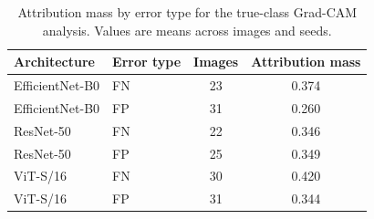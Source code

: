 \begin{table}[h]
\centering
\small
\caption{Attribution mass by error type for the true-class Grad-CAM analysis. Values are means across images and seeds.}
\label{tab:suppxai}
\begin{tabular}{llcc}
\toprule
Architecture & Error type & Images & Attribution mass \\
\midrule
EfficientNet-B0 & FN & 23 & 0.374 \\
EfficientNet-B0 & FP & 31 & 0.260 \\
ResNet-50 & FN & 22 & 0.346 \\
ResNet-50 & FP & 25 & 0.349 \\
ViT-S/16 & FN & 30 & 0.420 \\
ViT-S/16 & FP & 31 & 0.344 \\
\bottomrule
\end{tabular}
\end{table}
